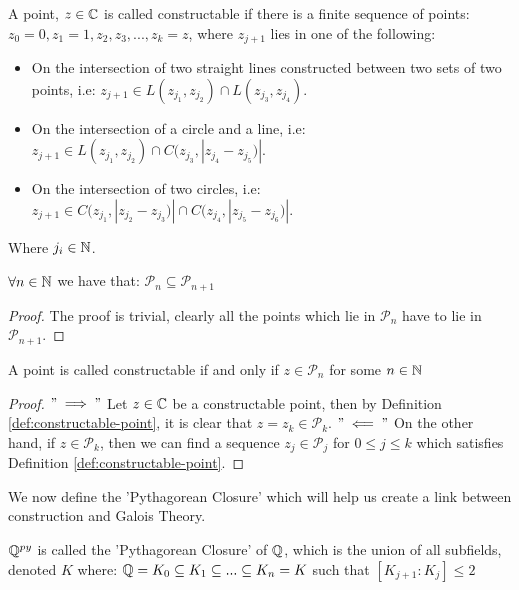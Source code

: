 \begin{definition}\label{def:constructable-point}
    A point, $z \in \mathbb C$ is called constructable if there is a finite sequence of points:
    $z_0=0,z_1=1,z_2,z_3,...,z_k=z$, where $z_{j+1}$ lies in one of the following:
    \begin{itemize}
        \item On the intersection of two straight lines constructed between two sets of two points, i.e:
        $z_{j+1}\in L(z_{j_1},z_{j_2})\cap L(z_{j_3},z_{j_4})$.
        \item On the intersection of a circle and a line, i.e:
        $z_{j+1}\in L(z_{j_1},z_{j_2})\cap C(z_{j_3},|z_{j_4}-z_{j_5})|$.
        \item On the intersection of two circles, i.e:
        $z_{j+1}\in C(z_{j_1},|z_{j_2}-z_{j_3})|\cap C(z_{j_4},|z_{j_5}-z_{j_6})|$. 
    \end{itemize}
    Where $j_i\in \mathbb N$.
\end{definition}

\begin{lemma}\label{thm:point-subset}
    $\forall n \in \mathbb N$ we have that:
    $\mathcal{P}_n \subseteq \mathcal{P}_{n+1}$
\end{lemma}

\begin{proof}
    The proof is trivial, clearly all the points which lie in  $\mathcal{P}_n$ have to lie in $\mathcal{P}_{n+1}$.
\end{proof}

\begin{theorem}
    A point is called constructable if and only if $z\in \mathcal{P}_n$ for some $n\in \mathbb N$
\end{theorem}

\begin{proof}  
    $"\implies"$ Let $z \in \mathbb C$ be a constructable point, then by Definition \ref{def:constructable-point}, it is clear that $z=z_k\in \mathcal{P}_k$.
    $"\impliedby"$ On the other hand, if $z \in \mathcal{P}_k$, then we can find a sequence $z_j \in \mathcal{P}_j$ for $0\leq j \leq k$ which satisfies Definition \ref{def:constructable-point}.
\end{proof}

We now define the 'Pythagorean Closure' which will help us create a link between construction and Galois Theory.

\begin{definition}
    $\mathbb Q^{py}$ is called the 'Pythagorean Closure' of $\mathbb Q$, which is the union of all subfields, denoted $K$ where:
    $\mathbb Q = K_0 \subseteq K_1 \subseteq ... \subseteq K_n=K$ such that $[K_{j+1}:K_j]\leq 2$
\end{definition}

